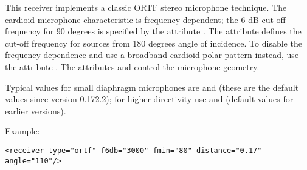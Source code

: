  
This receiver implements a classic ORTF stereo microphone
technique. The cardioid microphone characteristic is frequency
dependent; the 6 dB cut-off frequency for 90 degrees is specified by
the attribute . The attribute  defines the
cut-off frequency for sources from 180 degrees angle of incidence. To
disable the frequency dependence and use a broadband cardioid polar
pattern instead, use the attribute . The
attributes  and  control the
microphone geometry.

Typical values for small diaphragm microphones are 
and  (these are the default values since version
0.172.2); for higher directivity use 
and  (default values for earlier versions).



Example:

\begin{lstlisting}[numbers=none]
<receiver type="ortf" f6db="3000" fmin="80" distance="0.17" angle="110"/>
\end{lstlisting}


